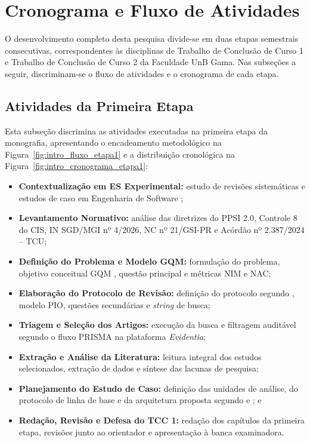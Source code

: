 \section{Cronograma e Fluxo de Atividades}
\label{sec:intro_cronograma}

O desenvolvimento completo desta pesquisa divide-se em duas etapas semestrais consecutivas, correspondentes às disciplinas de Trabalho de Conclusão de Curso 1 e Trabalho de Conclusão de Curso 2 da Faculdade UnB Gama. Nas subseções a seguir, discriminam-se o fluxo de atividades e o cronograma de cada etapa.

\subsection{Atividades da Primeira Etapa}
\label{subsec:intro_primeira_etapa}
\label{subsec:intro_etapa1}

Esta subseção discrimina as atividades executadas na primeira etapa da monografia, apresentando o encadeamento metodológico na Figura~\ref{fig:intro_fluxo_etapa1} e a distribuição cronológica na Figura~\ref{fig:intro_cronograma_etapa1}:
\begin{itemize}
    \item \textbf{Contextualização em ES Experimental:} estudo de revisões sistemáticas e estudos de caso em Engenharia de Software \cite{wohlin2024,runeson2009,yin2015};
    \item \textbf{Levantamento Normativo:} análise das diretrizes do PPSI 2.0, Controle 8 do CIS, IN SGD/MGI nº 4/2026, NC nº 21/GSI-PR e Acórdão nº 2.387/2024 -- TCU;
    \item \textbf{Definição do Problema e Modelo GQM:} formulação do problema, objetivo conceitual GQM \cite{basili1994}, questão principal e métricas NIM e NAC;
    \item \textbf{Elaboração do Protocolo de Revisão:} definição do protocolo segundo , modelo PIO, questões secundárias e \textit{string} de busca;
    \item \textbf{Triagem e Seleção dos Artigos:} execução da busca e filtragem auditável segundo o fluxo PRISMA na plataforma \textit{Evidentia};
    \item \textbf{Extração e Análise da Literatura:} leitura integral dos estudos selecionados, extração de dados e síntese das lacunas de pesquisa;
    \item \textbf{Planejamento do Estudo de Caso:} definição das unidades de análise, do protocolo de linha de base e da arquitetura proposta segundo  e ; e
    \item \textbf{Redação, Revisão e Defesa do TCC 1:} redação dos capítulos da primeira etapa, revisões junto ao orientador e apresentação à banca examinadora.
\end{itemize}

